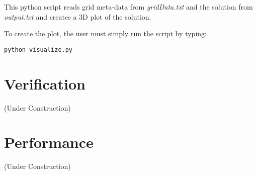 \documentclass[11pt]{report}
\begin{document}
This python script reads grid meta-data from \emph{gridData.txt} and the solution from \emph{output.txt} and creates a 3D plot of the solution.

To create the plot, the user must simply run the script by typing:

\begin{lstlisting}
python visualize.py
\end{lstlisting}

\chapter{Verification}
(Under Construction)

\chapter{Performance}
(Under Construction)
\end{document}
